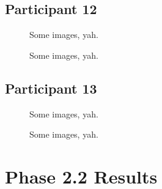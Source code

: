 
\clearpage

\subsection{Participant 12}

\begin{figure}[h]
	\caption{Some images, yah.}
\end{figure}

\lipsum[1]

\clearpage

\begin{figure}[h]
	\caption{Some images, yah.}
\end{figure}

\lipsum[1]


\clearpage

\subsection{Participant 13}

\begin{figure}[h]
	\caption{Some images, yah.}
\end{figure}

\lipsum[1]

\clearpage

\begin{figure}[h]
	\caption{Some images, yah.}
\end{figure}

\lipsum[1]


\clearpage

\section{Phase 2.2 Results}

